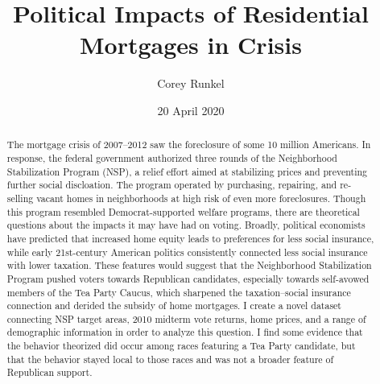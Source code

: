 \documentclass[12pt,oneside]{psthesis}
\title{Political Impacts of Residential Mortgages in Crisis}
\author{Corey Runkel}
\date{20 April 2020}
\begin{document}
  \maketitle

\frontmatter %

  \setcounter{tocdepth}{2}
  \tableofcontents
  \thispagestyle{plain} %

  \listoftables
  \thispagestyle{plain} %

  \listoffigures
  \thispagestyle{plain} %
  \begin{abstract}
  \thispagestyle{plain} %
  \doublespacing
    The mortgage crisis of 2007--2012 saw the foreclosure of some 10 million Americans.
    In response, the federal government authorized three rounds of the Neighborhood Stabilization Program (NSP), a relief effort aimed at stabilizing prices and preventing further social discloation.
    The program operated by purchasing, repairing, and re-selling vacant homes in neighborhoods at high risk of even more foreclosures.
    Though this program resembled Democrat-supported welfare programs, there are theoretical questions about the impacts it may have had on voting.
    Broadly, political economists have predicted that increased home equity leads to preferences for less social insurance, while early 21st-century American politics consistently connected less social insurance with lower taxation.
    These features would suggest that the Neighborhood Stabilization Program pushed voters towards Republican candidates, especially towards self-avowed members of the Tea Party Caucus, which sharpened the taxation--social insurance connection and derided the subsidy of home mortgages.
    I create a novel dataset connecting NSP target areas, 2010 midterm vote returns, home prices, and a range of demographic information in order to analyze this question.
    I find some evidence that the behavior theorized did occur among races featuring a Tea Party candidate, but that the behavior stayed local to those races and was not a broader feature of Republican support.
  \end{abstract}
\end{document}
